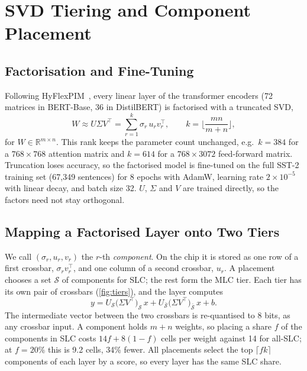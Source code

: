 \section{SVD Tiering and Component Placement}\label{sec:placement}

\subsection{Factorisation and Fine-Tuning}
Following HyFlexPIM~\cite{song2025hyflexpim}, every linear layer of the transformer encoders (72
matrices in BERT-Base, 36 in DistilBERT) is factorised with a truncated SVD,
\begin{equation}
W\approx U\Sigma V^{\top}=\sum_{r=1}^{k}\sigma_r\,u_r v_r^{\top},\qquad
k=\Big\lfloor\frac{mn}{m+n}\Big\rfloor,
\label{eq:svd}
\end{equation}
for $W\in\mathbb R^{m\times n}$. This rank keeps the parameter count unchanged, e.g.\ $k=384$ for a
$768\times768$ attention matrix and $k=614$ for a $768\times3072$ feed-forward matrix. Truncation loses
accuracy, so the factorised model is fine-tuned on the full SST-2 training set (67{,}349 sentences) for 8
epochs with AdamW, learning rate $2\times10^{-5}$ with linear decay, and batch size 32. $U$, $\Sigma$ and
$V$ are trained directly, so the factors need not stay orthogonal.

\subsection{Mapping a Factorised Layer onto Two Tiers}
We call $(\sigma_r,u_r,v_r)$ the $r$-th \emph{component}. On the chip it is stored as one row of a first
crossbar, $\sigma_r v_r^{\top}$, and one column of a second crossbar, $u_r$. A placement chooses a set
$\mathcal S$ of components for SLC; the rest form the MLC tier. Each tier has its own pair of crossbars
(\cref{fig:tiers}), and the layer computes
\begin{equation}
y=U_{\mathcal S}\big(\Sigma V^{\top}\big)_{\mathcal S}\,x+U_{\bar{\mathcal S}}\big(\Sigma V^{\top}\big)_{\bar{\mathcal S}}\,x+b.
\label{eq:tiers}
\end{equation}
The intermediate vector between the two crossbars is re-quantised to 8 bits, as any crossbar input. A
component holds $m+n$ weights, so placing a share $f$ of the components in SLC costs $14f+8(1-f)$ cells per
weight against 14 for all-SLC; at $f=20\%$ this is 9.2 cells, 34\% fewer. All placements select the top
$\lceil fk\rceil$ components of each layer by a score, so every layer has the same SLC share.

